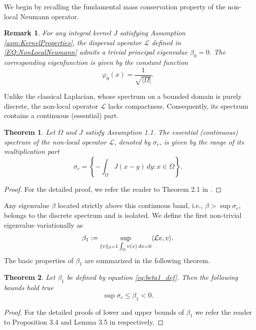 \documentclass[11pt, a4paper]{article}
\theoremstyle{break}
\newtheorem{thm}{Theorem}[section]
\theoremstyle{break}
\theoremstyle{break}
\theoremstyle{break}
\newtheorem{rem}{Remark}[section]
\theoremstyle{break}
\theoremstyle{break}
\theoremstyle{break}
\theoremstyle{break}
\theoremstyle{break}
\begin{document}
We begin by recalling the fundamental mass conservation property of the non-local Neumann operator.

\begin{rem}
    For any integral kernel $J$ satisfying Assumption \ref{asm:KernelProperties}, the dispersal operator $\mathcal{L}$ defined in \eqref{EQ:NonLocalNeumann} admits a trivial principal eigenvalue $\beta_0 = 0$. The corresponding eigenfunction is given by the constant function 
    \begin{equation}
        \varphi_0(x) = \frac{1}{\sqrt{|\Omega|}}.
    \end{equation}
\end{rem}

Unlike the classical Laplacian, whose spectrum on a bounded domain is purely discrete, the non-local operator $\mathcal{L}$ lacks compactness. Consequently, its spectrum contains a continuous (essential) part.

\begin{thm}
    Let $\Omega$ and $J$ satisfy Assumption 1.1. The essential (continuous) spectrum of the non-local operator $\mathcal{L}$, denoted by $\sigma_c$, is given by the range of its multiplication part
    \begin{equation}
        \sigma_c = \left\{ -\int_\Omega J(x-y) \,dy : x \in \overline{\Omega} \right\}.
    \end{equation}
\end{thm}
\begin{proof}
    For the detailed proof, we refer the reader to Theorem 2.1 in \cite{Tadej2025}.
\end{proof}

Any eigenvalue $\beta$ located strictly above this continuous band, i.e., $\beta > \sup \sigma_c$, belongs to the discrete spectrum and is isolated. We define the first non-trivial eigenvalue variationally as
\begin{equation}\label{eq:beta1_def}
    \beta_1 := \sup_{\|v\|_2 = 1 \\ \int_\Omega v(x) \:dx = 0} \langle \mathcal{L}v, v \rangle.
\end{equation}
The basic properties of $\beta_1$ are summarized in the following theorem.

\begin{thm}
    \label{thm:beta1_bounds}
    Let $\beta_1$ be defined by equation \eqref{eq:beta1_def}. Then the following bounds hold true
    \begin{equation}
        \sup \sigma_c \leq \beta_1 < 0.
    \end{equation}
\end{thm}
\begin{proof}
    For the detailed proofs of lower and upper bounds of $\beta_1$ we refer the reader to Proposition 3.4 and Lemma 3.5 in \cite{AndreuVaillo2010} respectively.
\end{proof}
\end{document}
